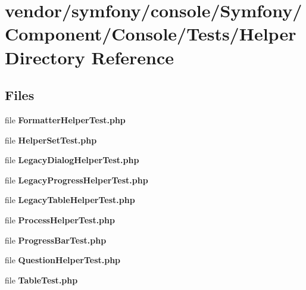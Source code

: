 \section{vendor/symfony/console/\+Symfony/\+Component/\+Console/\+Tests/\+Helper Directory Reference}
\label{dir_a73f43079f03178fba780c60587cf259}
\subsection*{Files}
\begin{DoxyCompactItemize}
\item 
file {\bf Formatter\+Helper\+Test.\+php}
\item 
file {\bf Helper\+Set\+Test.\+php}
\item 
file {\bf Legacy\+Dialog\+Helper\+Test.\+php}
\item 
file {\bf Legacy\+Progress\+Helper\+Test.\+php}
\item 
file {\bf Legacy\+Table\+Helper\+Test.\+php}
\item 
file {\bf Process\+Helper\+Test.\+php}
\item 
file {\bf Progress\+Bar\+Test.\+php}
\item 
file {\bf Question\+Helper\+Test.\+php}
\item 
file {\bf Table\+Test.\+php}
\end{DoxyCompactItemize}

